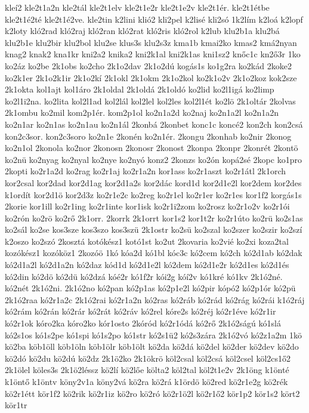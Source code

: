 {kleí2
kle2t1a2n
kle2tál
kle2t1elv
kle2t1e2r
kle2t1e2v
kle2t1ér.
kle2t1étbe
kle2t1é2té
kle2t1é2ve.
kle2tin
k2lini
klió2
kli2pel
k2lisé
kli2só
1k2lím
k2loá
k2lopf
k2loty
kló2rad
kló2raj
kló2ran
kló2rat
kló2ris
kló2rol
k2lub
klu2b1a
klu2bá
klu2b1e
klu2bir
klu2bol
klu2se
klus3s
klu2s3z
kma1b
kmai2ko
kmas2
kmá2nyan
knag2
knak2
kna1kr
kni2a2
knika2
kni2k1al
kni2k1as
kni1sz2
knőc1c
kn2ő3r
1ko
ko2áz
ko2be
2k1obs
ko2cho
2k1o2dav
2k1o2dú
kogás1s
ko1g2ra
ko2kád
2koke2
ko2k1er
2k1o2k1ir
2k1o2kí
2k1okl
2k1okm
2k1o2kol
ko2k1o2v
2k1o2koz
kok2sze
2k1okta
kol1ajt
kol1áro
2k1oldal
2k1oldá
2k1oldó
ko2lid
ko2l1igá
ko2limp
ko2l1i2na.
ko2lita
kol2l1ad
kol2lál
kol2lel
kol2les
kol2l1ét
ko2lö
2k1oltár
2kolvas
2k1ombu
ko2mil
kom2p1ér.
kom2p1ol
ko2n1a2d
ko2naj
ko2n1a2l
ko2n1a2n
ko2n1ar
ko2n1as
ko2n1au
ko2n1ál
2konbá
2konbet
konc1c
koncé2
kon2ch
kon2csá
kon2c3sor.
kon2c3soro
ko2n1e
2konén
ko2n1ér.
2kongu
2konhab
ko2nir
2konog
ko2n1ol
2konola
ko2nor
2konosn
2konosr
2konost
2konpa
2konpr
2konrét
2kontö
ko2nü
ko2nyag
ko2nyal
ko2nye
ko2nyó
konz2
2konzs
ko2ón
kopá2sé
2kopc
ko1pro
2kopti
ko2r1a2d
ko2rag
ko2r1aj
ko2r1a2n
kor1ass
ko2r1aszt
ko2r1átl
2k1orch
kor2csal
kor2dad
kor2d1ag
kor2d1a2s
kor2dác
kord1d
kor2d1e2l
kor2dem
kor2des
k1ordít
kor2d1ö
kor2d3z
ko2r1e2c
ko2reg
ko2r1el
ko2r1er
ko2r1es
kor1f2
korgás1s
2korie
kor1ill
ko2r1ing
ko2r1inte
kor1isk
ko2r1i2zom
ko2rosz
ko2r1o2v
ko2r1ói
ko2rón
ko2rö
ko2rő
2k1orr.
2korrk
2k1orrt
kor1s2
kor1t2r
ko2r1úto
ko2rü
ko2s1as
ko2sál
ko2se
kos3sze
kos3szo
kos3szü
2k1ostr
ko2sü
ko2szal
ko2szer
ko2szir
ko2szí
k2oszo
ko2szó
2kosztá
kotókész1
kotó1st
ko2ut
2kovaria
ko2vié
ko2xi
koza2tal
kozókész1
kozóköz1
2kozóö
1kó
kóa2d
kó1bl
kóc3c
kó2cem
kó2ch
kó2d1ab
kó2dak
kó2d1a2l
kó2d1a2n
kó2daz
kód1d
kó2d1e2l
kó2dem
kó2d1e2r
kó2d1es
kó2d1és
kó2din
kó2dö
kó2dü
kó2dzá
kóé2r
kó1f2r
kói2g
kóí2v
kó1kré
kó1kv
2k1ó2né.
kó2nét
2k1ó2ni.
2k1ó2no
kó2pan
kó2p1as
kó2p1e2l
kó2pir
kópó2
kó2p1ór
kó2pü
2k1ó2raa
kó2r1a2c
2k1ó2rai
kó2r1a2n
kó2ras
kó2ráb
kó2rád
kó2rág
kó2rái
k1ó2ráj
kó2rám
kó2rán
kó2rár
kó2rát
kó2ráv
kó2rel
kóre2s
kó2réj
kó2r1éve
kó2r1ir
kó2r1ok
kóro2ka
kóro2ko
kór1osto
2kóród
kó2r1ódá
kó2rő
2k1ó2ságú
kó1slá
kó2s1os
kó1s2pe
kó1spi
kó1s2po
kó1str
kó2s1ü2
kó2s3zára
2k1ó2vó
kó2z1a2m
1kö
kö2ba
köb1öll
köb1öln
köb1ölr
köb1ölt
kö2da
kö2dá
kö2del
kö2der
kö2dev
kö2do
kö2dó
kö2du
kö2dú
kö2dz
2k1ö2ko
2k1ökrö
köl2csal
köl2csá
köl2csel
köl2cs1ő2
2k1ölel
köles3s
2k1ö2léssz
kö2lí
kö2lőe
költa2
köl2tal
köl2t1e2v
2k1öng
k1önté
k1öntő
k1öntv
köny2v1a
köny2vá
kö2ra
kö2rá
k1ördö
kö2red
kö2r1e2g
kö2rék
kö2r1étt
kör1f2
kö2rik
kö2r1iz
kö2ro
kö2ró
kö2r1ö2l
kö2r1ő2
kör1p2
kör1s2
kört2
kör1tr
}
